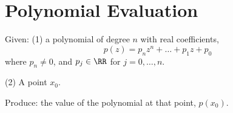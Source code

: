 \chapter{Polynomial Evaluation}

\begin{problem}
  Given: (1) a polynomial of degree $n$ with real coefficients,
  \begin{equation*}
    p(z) = p_{n}z^{n} + \dots + p_{1}z + p_{0}
  \end{equation*}
  where $p_{n}\neq0$, and $p_{j}\in\RR$ for $j=0,\dots,n$.

  (2) A point $x_{0}$.

  Produce: the value of the polynomial at that point, $p(x_{0})$.
\end{problem}





